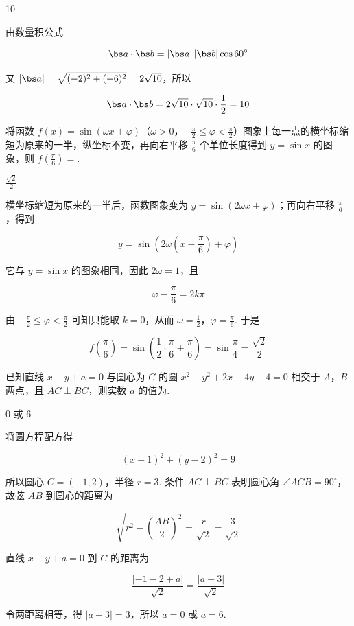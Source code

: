 \begin{answer}
10
\end{answer}

\begin{solution}
由数量积公式

\[
\bs a\cdot\bs b=|\bs a|\,|\bs b|\cos60^\circ
\]

又 \(|\bs a|=\sqrt{(-2)^2+(-6)^2}=2\sqrt{10}\)，所以

\[
\bs a\cdot\bs b=2\sqrt{10}\cdot\sqrt{10}\cdot\frac12=10
\]
\end{solution}

\begin{problem}
将函数 \( f(x) = \sin (\omega x + \varphi) \)（\(\omega > 0\)，\(-\frac{\pi}{2} \leqslant \varphi < \frac{\pi}{2}\)）图象上每一点的横坐标缩短为原来的一半，纵坐标不变，再向右平移 \(\frac{\pi}{6}\) 个单位长度得到 \( y = \sin x \) 的图象，则 \( f\left(\frac{\pi}{6}\right) = \)\fillinblank{}.
\end{problem}

\begin{answer}
\(\frac{\sqrt{2}}{2}\)
\end{answer}

\begin{solution}
横坐标缩短为原来的一半后，函数图象变为 \(y=\sin(2\omega x+\varphi)\)；再向右平移 \(\frac\pi6\)，得到

\[
y=\sin\left(2\omega\left(x-\frac\pi6\right)+\varphi\right)
\]

它与 \(y=\sin x\) 的图象相同，因此 \(2\omega=1\)，且

\[
\varphi-\frac\pi6=2k\pi
\]

由 \(-\frac\pi2\leqslant\varphi<\frac\pi2\) 可知只能取 \(k=0\)，从而 \(\omega=\frac12\)，\(\varphi=\frac\pi6\). 于是

\[
f\left(\frac\pi6\right)=\sin\left(\frac12\cdot\frac\pi6+\frac\pi6\right)=\sin\frac\pi4=\frac{\sqrt2}{2}
\]
\end{solution}

\begin{problem}
已知直线 \(x - y + a = 0\) 与圆心为 \(C\) 的圆 \(x^{2} + y^{2} + 2x - 4y - 4 = 0\) 相交于 \(A\)，\(B\) 两点，且 \(AC \perp BC\)，则实数 \(a\) 的值为\fillinblank{}.
\end{problem}

\begin{answer}
\(0\) 或 \(6\)
\end{answer}

\begin{solution}
将圆方程配方得

\[
(x+1)^2+(y-2)^2=9
\]

所以圆心 \(C=(-1,2)\)，半径 \(r=3\). 条件 \(AC\perp BC\) 表明圆心角 \(\angle ACB=90^\circ\)，故弦 \(AB\) 到圆心的距离为

\[
\sqrt{r^2-\left(\frac{AB}{2}\right)^2}=\frac r{\sqrt2}=\frac3{\sqrt2}
\]

直线 \(x-y+a=0\) 到 \(C\) 的距离为

\[
\frac{|{-1}-2+a|}{\sqrt2}=\frac{|a-3|}{\sqrt2}
\]

令两距离相等，得 \(|a-3|=3\)，所以 \(a=0\) 或 \(a=6\).
\end{solution}

